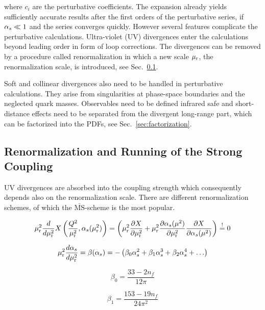 where $c_i$ are the perturbative coefficients. The expansion already yields
sufficiently accurate results after the first orders of the perturbative series,
if $\alpha_{s} \ll 1$ and the series converges quickly. However several features
complicate the perturbative calculations. Ultra-violet (UV) divergences enter
the calculations beyond leading order in form of loop corrections. The
divergences can be removed by a procedure called renormalization in which a new
scale $\mu_{\mathrm{r}}$, the renormalization scale, is introduced, see
Sec.~\ref{sec:renormalization}.

Soft and collinear divergences also need to be handled in perturbative
calculations. They arise from singularities at phase-space boundaries and the
neglected quark masses. Observables need to be defined infrared safe and
short-distance effects need to be separated from the divergent long-range part,
which can be factorized into the PDFs, see Sec.~\ref{sec:factorization}.

\subsection{Renormalization and Running of the Strong Coupling}
\label{sec:renormalization}

UV divergences are
absorbed into the coupling strength which consequently depends also on the
renormalization scale. There are different renormalization schemes, of which the
$\bar{\mathrm{MS}}$-scheme is the most popular.


\begin{equation} 
    \mu_{\mathrm{r}}^2 \frac{d}{d \mu_{\mathrm{r}}^2} X \left(\frac{Q^2}{\mu_{\mathrm{r}}^2},\alpha_{s}(\mu_{\mathrm{r}}^2)\right) = \left(
    \mu_{\mathrm{r}}^2 \frac{\partial X}{\partial \mu_{\mathrm{r}}^2} + \mu_{\mathrm{r}}^2 \frac{\partial
    \alpha_{s}(\mu^2)}{\partial \mu_{\mathrm{r}}^2} \frac{\partial X}{\partial \alpha_{s}(\mu^2)} \right) \stackrel{!}{=} 0 
\end{equation}


\begin{equation}
    \mu_{\mathrm{r}}^2 \frac{d \alpha_{s}}{d \mu_{\mathrm{r}}^2} = \beta(\alpha_{s}) = - \left( \beta_0 \alpha_{s}^2 + \beta_1 \alpha_{s}^3
    + \beta_2 \alpha_{s}^4 + \ldots \right)
\end{equation}

\begin{equation} 
    \beta_0 = \frac{33 - 2 n_f}{12\pi}
\end{equation}

\begin{equation} 
    \beta_1 = \frac{153 - 19 n_f}{24\pi^2}
\end{equation}

